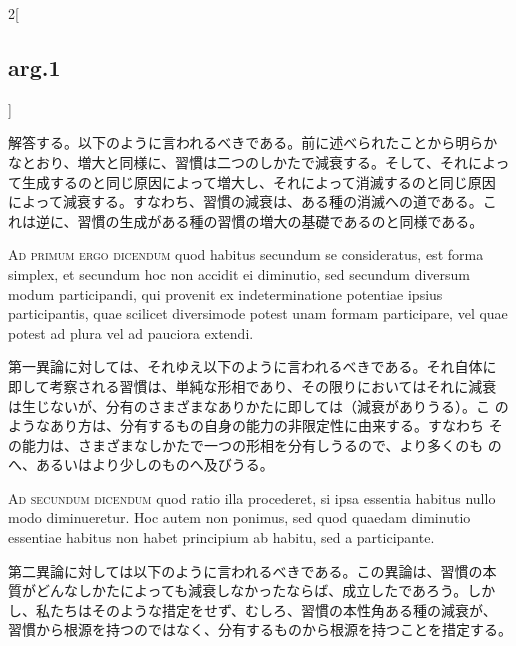 \documentclass[paper=a4paper,fontsize=10pt,jafontsize=9pt,titlepage]{jlreq}
\begin{document}
\begin{paracol}{2}[\subsection{arg.1}]
\switchcolumn

解答する。以下のように言われるべきである。前に述べられたことから明らか
なとおり、増大と同様に、習慣は二つのしかたで減衰する。そして、それによっ
て生成するのと同じ原因によって増大し、それによって消滅するのと同じ原因
によって減衰する。すなわち、習慣の減衰は、ある種の消滅への道である。こ
れは逆に、習慣の生成がある種の習慣の増大の基礎であるのと同様である。

\switchcolumn*[\subsection{ad.1}]

{\scshape Ad primum ergo dicendum} quod habitus secundum se
consideratus, est forma simplex, et secundum hoc non accidit ei
diminutio, sed secundum diversum modum participandi, qui provenit ex
indeterminatione potentiae ipsius participantis, quae scilicet
diversimode potest unam formam participare, vel quae potest ad plura
vel ad pauciora extendi.

\switchcolumn

第一異論に対しては、それゆえ以下のように言われるべきである。それ自体に
即して考察される習慣は、単純な形相であり、その限りにおいてはそれに減衰
は生じないが、分有のさまざまなありかたに即しては（減衰がありうる）。こ
のようなあり方は、分有するもの自身の能力の非限定性に由来する。すなわち
その能力は、さまざまなしかたで一つの形相を分有しうるので、より多くのも
のへ、あるいはより少しのものへ及びうる。

\switchcolumn*[\subsection{ad.2}]

{\scshape Ad secundum dicendum} quod ratio illa procederet, si ipsa
essentia habitus nullo modo diminueretur. Hoc autem non ponimus, sed
quod quaedam diminutio essentiae habitus non habet principium ab
habitu, sed a participante.

\switchcolumn

第二異論に対しては以下のように言われるべきである。この異論は、習慣の本
質がどんなしかたによっても減衰しなかったならば、成立したであろう。しか
し、私たちはそのような措定をせず、むしろ、習慣の本性角ある種の減衰が、
習慣から根源を持つのではなく、分有するものから根源を持つことを措定する。

\switchcolumn*[\subsection{ad.3}]


\end{paracol}
\end{document}
